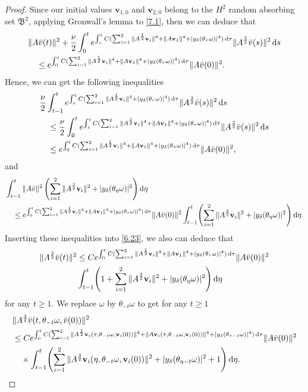 \documentclass{elsarticle}
\theoremstyle{definition}
\numberwithin{equation}{section}
\renewcommand{\d}{{\rm{d}}}
\begin{document}
\begin{proof}
Since our initial values $\textbf{v}_{1,0}$ and $\textbf{v}_{2,0}$   belong to the $H^2$ random  absorbing set  $\mathfrak B^2$,  applying Gronwall's lemma to \eqref{7.1}, then we can deduce    that
\begin{align*}
 & \|A\bar{v}(t)\|^2 + \frac{\nu}{2} \int_0^te^{\int_s^tC( \sum_{i=1}^2 \|A^\frac12\textbf{v}_i\|^4+\|A\textbf{v}_1\|^4+|y_\delta(\theta_\tau\omega)|^4)\, \d \tau}\|A^\frac32\bar{v}(s) \|^2\, \d s
\nonumber\\
&\quad \leq e^{\int_0^tC( \sum_{i=1}^2 \|A^\frac12\textbf{v}_i\|^4+\|A\textbf{v}_1\|^4+|y_\delta(\theta_\tau\omega)|^4)\, \d \tau}\|A\bar{v}(0)\|^2.
\end{align*}
Hence, we can get the  following inequalities
\begin{align*}
& \frac{\nu}{2} \int_{t-1}^te^{\int_s^tC( \sum_{i=1}^2 \|A^\frac12\textbf{v}_i\|^4+|y_\delta(\theta_\tau\omega)|^4)\, \d \tau}\|A^\frac32\bar{v}(s)\|^2\, \d s\nonumber\\
&\quad  \leq\frac{\nu}{2} \int_0^te^{\int_s^tC( \sum_{i=1}^2 \|A^\frac12\textbf{v}_i\|^4+\|A\textbf{v}_1\|^4+|y_\delta(\theta_\tau\omega)|^4)\, \d \tau}\|A^\frac32\bar{v}(s) \|^2\, \d s\nonumber\\
&\quad \leq e^{\int_{0}^tC( \sum_{i=1}^2 \|A^\frac12\textbf{v}_i\|^4+\|A\textbf{v}_1\|^4+|y_\delta(\theta_\tau \omega)|^4)\, \d \tau}\|A\bar{v}(0)\|^2, \nonumber
\end{align*}
and
\begin{align}
&
\int_{t-1}^t\|A\bar{v}\|^2 \left (\sum_{i=1}^2\|A^\frac32\textbf{v}_i\|^2+|y_\delta(\theta_\eta\omega)|^2\right) \d \eta\nonumber\\
&\quad \leq e^{\int_0^tC( \sum_{i=1}^2 \|A^\frac12\textbf{v}_i\|^4+\|A\textbf{v}_1\|^4+|y_\delta(\theta_\tau\omega)|^4)\, \d \tau}\|A\bar{v}(0)\|^2
\int_{t-1}^t \!  \left (\sum_{i=1}^2\|A^\frac32\textbf{v}_i\|^2+|y_\delta(\theta_\eta\omega)|^2\right) \d \eta.\nonumber
\end{align}
Inserting these inequalities  into \eqref{6.23}, we also can deduce that
\begin{align}
 \|A^\frac32\bar{v}(t)\|^2
&\leq Ce^{\int_0^tC( \sum_{i=1}^2 \|A^\frac12\textbf{v}_i\|^4+\|A\textbf{v}_1\|^4+|y_\delta(\theta_\tau\omega)|^4)\, \d \tau}\|A\bar{v}(0)\|^2\nonumber\\
&\int_{t-1}^t  \! \left (1+\sum_{i=1}^2\|A^\frac32\textbf{v}_i\|^2+|y_\delta(\theta_\eta\omega)|^2\right)  \d \eta   \nonumber
\end{align}
for any $t\geq 1$.
We replace $\omega$ by $\theta_{-t}\omega$ to  get  for any $ t\geq 1$
\begin{align} \label{7.6}
 &\|A^\frac32\bar{v}(t,\theta_{-t}\omega,\bar{v}(0))\|^2\nonumber\\
&\leq Ce^{\int_0^tC( \sum_{i=1}^2\|A^\frac12\textbf{v}_i(\tau,\theta_{-t}\omega,\textbf{v}_i(0))\|^4
+\|A\textbf{v}_i(\tau,\theta_{-t}\omega,\textbf{v}_i(0))\|^4
+|y_\delta(\theta_{\tau-t}\omega)|^4)\, \d \tau}\|A\bar{v}(0)\|^2\nonumber\\
&\quad  \times \int_{t-1}^t  \! \left ( \sum_{i=1}^2\|A^\frac32\textbf{v}_i(\eta,\theta_{-t}\omega,\textbf{v}_{i}(0))\|^2+|y_\delta(\theta_{\eta-t}\omega)|^2+1\right) \d \eta.
\end{align}



\end{proof}
\end{document}
